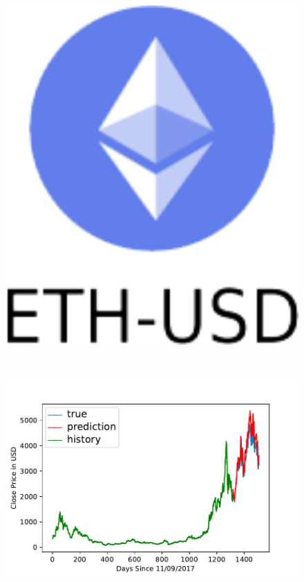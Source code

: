 \begin{figure}[p]
\begin{minipage}{.05\textwidth}
\includegraphics[width=1.0\textwidth]{images/eth-usd.png}
\end{minipage}
\ \
\begin{minipage}{.4\textwidth}
\includegraphics[width=1.0\textwidth]{images/ETH-USD-prediction-model.pdf}
\end{minipage}

\end{figure}
